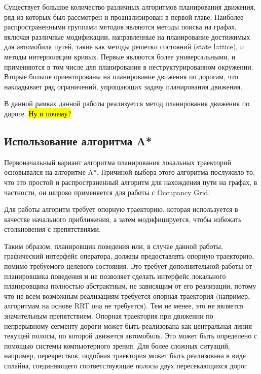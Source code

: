 Существует большое количество различных алгоритмов планирования движения, ряд из которых был рассмотрен и проанализирован
в первой главе. Наиболее распространенными группами методов являются методы поиска на графах, включая различные
модификации, направленные на планирование достижимых для автомобиля путей, такие как методы решетки состояний
(state lattice), и методы интерполяции кривых. Первые являются более универсальными, и применяются в том числе для
планирования в неструктурированном окружении. Вторые больше ориентированы на планирование движения по дорогам, что
накладывает ряд ограничений, упрощающих задачу планирования движения.

В данной рамках данной работы реализуется метод планирования движения по дороге. \hl{Ну и почему?}

\subsection{Использование алгоритма A*}
Первоначальный вариант алгоритма планирования локальных траекторий основывался на алгоритме A*. Причиной
выбора этого алгоритма послужило то, что это простой  и распространенный алгоритм для нахождения пути
на графах, в частности, он широко применяется для работы с Occupancy Grid.

Для работы алгоритм требует опорную траекторию, которая используется в качестве начального приближения, а затем
модифицируется, чтобы избежать столкновения с препятствиями.

Таким образом, планировщик поведения или, в случае данной работы, графический интерфейс оператора, должны предоставлять
опорную траекторию, помимо требуемого целевого состояния. Это требует дополнительной работы от планировшика поведения
и не позволяет сделать интерфейс локального планировщика полностью абстрактным, не зависящим от его реализации, потому
что не всем возможным реализациям требуется опорная траектория (например, алгоритмам на основе RRT она не требуется).
Тем не менее, это не является значительным препятствием. Опорная траектория при движении по непрерывному сегменту дороги
может быть реализована как центральная линия текущей полосы, по которой движется автомобиль. Это может быть определено
с помощью системы компьютерного зрения. Для более сложных ситуаций, например, перекрестков, подобная траектория может
быть реализована в виде сплайна, соединяющего соответствующие полосы двух пересекающихся дорог.

